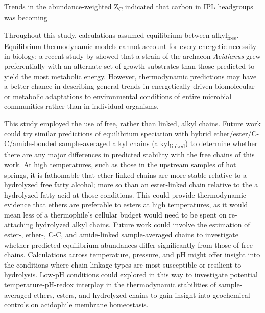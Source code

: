 Trends in the abundance-weighted Z\textsubscript{C} indicated that carbon in IPL headgroups was becoming 



Throughout this study, calculations assumed equilibrium between alkyl\textsubscript{free}. Equilibrium thermodynamic models cannot account for every energetic necessity in biology; a recent study by \cite{amenabar2017microbial} showed that a strain of the archaeon \textit{Acidianus} grew preferentially with an alternate set of growth substrates than those predicted to yield the most metabolic energy. However, thermodynamic predictions may have a better chance in describing general trends in energetically-driven biomolecular or metabolic adaptations to environmental conditions of entire microbial communities rather than in individual organisms.

This study employed the use of free, rather than linked, alkyl chains. Future work could try similar predictions of equilibrium speciation with hybrid ether/ester/C-C/amide-bonded sample-averaged alkyl chains (alkyl\textsubscript{linked}) to determine whether there are any major differences in predicted stability with the free chains of this work. At high temperatures, such as those in the upstream samples of hot springs, it is fathomable that ether-linked chains are more stable relative to a hydrolyzed free fatty alcohol; more so than an ester-linked chain relative to the a hydrolyzed fatty acid at those conditions. This could provide thermodynamic evidence that ethers are preferable to esters at high temperatures, as it would mean less of a thermophile's cellular budget would need to be spent on re-attaching hydrolyzed alkyl chains. Future work could involve the estimation of ester-, ether-, C-C, and amide-linked sample-averaged chains to investigate whether predicted equilibrium abundances differ significantly from those of free chains. Calculations across temperature, pressure, and pH might offer insight into the conditions where chain linkage types are most susceptible or resilient to hydrolysis. Low-pH conditions could explored in this way to investigate potential temperature-pH-redox interplay in the thermodynamic stabilities of sample-averaged ethers, esters, and hydrolyzed chains to gain insight into geochemical controls on acidophile membrane homeostasis.





